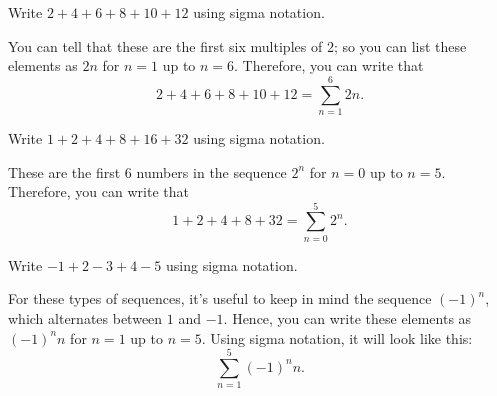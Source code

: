 \documentclass[
  12pt,
  a4paper, oneside]{starmastarticle}
\begin{document}
\begin{tcolorbox}[enhanced jigsaw, colframe=quarto-callout-note-color-frame, left=2mm, rightrule=.15mm, opacityback=0, arc=.35mm, bottomrule=.15mm, breakable, toprule=.15mm, colback=white, leftrule=.75mm]
\begin{minipage}[t]{5.5mm}
\textcolor{quarto-callout-note-color}{\faInfo}
\end{minipage}%
\begin{minipage}[t]{\textwidth - 5.5mm}
Write \(2 + 4 + 6 + 8 + 10 + 12\) using sigma notation.

You can tell that these are the first six multiples of \(2\); so you can
list these elements as \(2n\) for \(n = 1\) up to \(n = 6\). Therefore,
you can write that
\[2 + 4 + 6 + 8 + 10 + 12 = \sum_{n=1}^6 2n.\]\end{minipage}%
\end{tcolorbox}

\begin{tcolorbox}[enhanced jigsaw, colframe=quarto-callout-note-color-frame, left=2mm, rightrule=.15mm, opacityback=0, arc=.35mm, bottomrule=.15mm, breakable, toprule=.15mm, colback=white, leftrule=.75mm]
\begin{minipage}[t]{5.5mm}
\textcolor{quarto-callout-note-color}{\faInfo}
\end{minipage}%
\begin{minipage}[t]{\textwidth - 5.5mm}
Write \(1 + 2 + 4 + 8 + 16 + 32\) using sigma notation.

These are the first 6 numbers in the sequence \(2^n\) for \(n=0\) up to
\(n=5\). Therefore, you can write that
\[1 + 2 + 4 + 8 + 32 = \sum_{n=0}^5 2^n.\]\end{minipage}%
\end{tcolorbox}

\begin{tcolorbox}[enhanced jigsaw, colframe=quarto-callout-note-color-frame, left=2mm, rightrule=.15mm, opacityback=0, arc=.35mm, bottomrule=.15mm, breakable, toprule=.15mm, colback=white, leftrule=.75mm]
\begin{minipage}[t]{5.5mm}
\textcolor{quarto-callout-note-color}{\faInfo}
\end{minipage}%
\begin{minipage}[t]{\textwidth - 5.5mm}
Write \(-1 + 2 -3 + 4 - 5\) using sigma notation.

For these types of sequences, it's useful to keep in mind the sequence
\((-1)^n\), which alternates between \(1\) and \(-1\). Hence, you can
write these elements as \((-1)^nn\) for \(n=1\) up to \(n=5\). Using
sigma notation, it will look like this:
\[\sum_{n=1}^5 (-1)^nn.\]\end{minipage}%
\end{tcolorbox}
\end{document}
